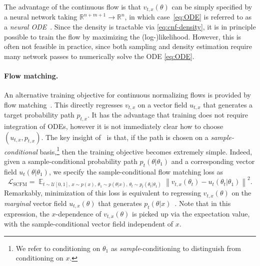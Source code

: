 \documentclass{article}
\theoremstyle{remark}
\DeclareMathOperator{\Ex}{\ensuremath{\mathbb{E}}}
\begin{document}
The advantage of the continuous flow is that $v_{t,x}(\theta)$ can be simply specified by a neural network taking $\mathbb{R}^{n+m+1} \to \mathbb{R}^n$, in which case~\eqref{eq:ODE} is referred to as a \emph{neural ODE}~\cite{neural_ode}. Since the density is tractable via \eqref{eq:cnf-density}, it is in principle possible to train the flow by maximizing the (log-)likelihood. However, this is often not feasible in practice, since both sampling and density estimation require many network passes to numerically solve the ODE \eqref{eq:ODE}. 





\paragraph{Flow matching.} An alternative training objective for continuous normalizing flows is provided by flow matching~\cite{flow_matching}. This directly regresses $v_{t,x}$ on a vector field $u_{t,x}$ that generates a target probability path $p_{t,x}$. It has the advantage that training does not require integration of ODEs, however it is not immediately clear how to choose $(u_{t,x},p_{t,x})$. The key insight of~\citep{flow_matching} is that, if the path is chosen on a \emph{sample-conditional} basis,\footnote{We refer to conditioning on $\theta_1$ as \emph{sample}-conditioning to distinguish from conditioning on $x$.} then the training objective becomes extremely simple. Indeed, given a sample-conditional probability path $p_t(\theta|\theta_1)$ and a corresponding vector field $u_t(\theta|\theta_1)$, we specify the sample-conditional flow matching loss as
\begin{equation}\label{eq:flow-matching}
  \mathcal{L}_\text{SCFM} = \Ex_{t\sim \mathcal{U}[0,1],\,x\sim p(x),\,\theta_1\sim p(\theta|x),\,\theta_t\sim p_t(\theta_t | \theta_1)} \left\| v_{t,x}(\theta_t) - u_t(\theta_t| \theta_1)\right\|^2.
\end{equation}
Remarkably, minimization of this loss is equivalent to regressing $v_{t,x}(\theta)$ on the \emph{marginal} vector 
field $u_{t,x}(\theta)$ 
that generates $p_t(\theta|x)$~\citep{flow_matching}. Note that in this expression, the $x$-dependence of $v_{t,x}(\theta)$ is picked up via the expectation value, with the sample-conditional vector field independent of $x$.
\end{document}
